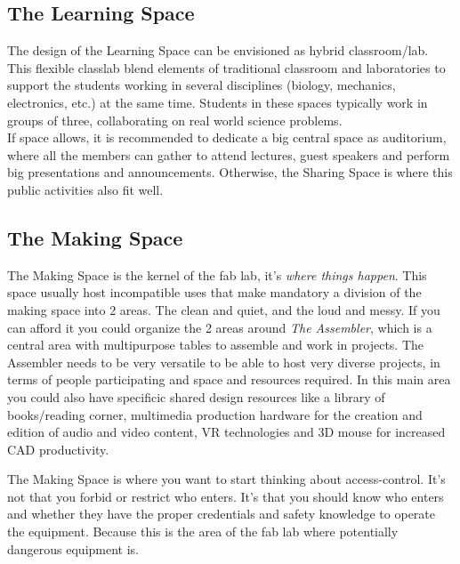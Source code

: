 \documentclass[a4paper,12pt,titlepage]{article}
\begin{document}
\subsection{The Learning Space}
The design of the
Learning Space can be
envisioned as hybrid
classroom/lab.
This flexible
classlab blend
elements of traditional
classroom and
laboratories to
support the students working
in several disciplines
(biology, mechanics,
electronics, etc.) at the same time. Students in these spaces typically work in
groups of three, collaborating on real world science problems.\\ 

If space allows, it is recommended to dedicate a big central space as auditorium, where all the members can gather to attend
lectures, guest speakers and perform big presentations and announcements. Otherwise, the Sharing Space is where this public activities also fit well.


\subsection{The Making Space}
The Making Space is the kernel of the fab lab, it's \textit{where things happen}. This
space  usually host incompatible uses that make mandatory a division of the making space into 2 areas. The clean and quiet, and the loud and messy. If you can afford it you could organize the 2 areas around \textit{The
Assembler}, which is a central area with multipurpose tables to assemble and work in projects.
The Assembler needs to be very versatile to be able to host very diverse projects, in terms of
people participating and space and resources required. In this main area you could also have specificic shared design resources like a library of books/reading corner, multimedia production hardware for the creation and edition of audio and video content, VR technologies and 3D mouse for increased CAD productivity.

\begin{figure}[h]
\centering
{}
\end{figure}
The Making Space is where you want to start thinking about access-control. It's not that you forbid or restrict who enters. It's that you should know who enters and whether they have the proper credentials and safety knowledge to operate the equipment. Because this is the area of the fab lab where potentially dangerous equipment is.
\end{document}
